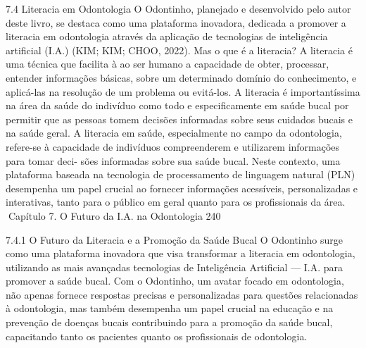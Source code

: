 7.4     Literacia em Odontologia
O Odontinho, planejado e desenvolvido pelo autor deste livro, se destaca como uma
plataforma inovadora, dedicada a promover a literacia em odontologia através da
aplicação de tecnologias de inteligência artificial (I.A.) (KIM; KIM; CHOO, 2022).
          Mas o que é a literacia? A literacia é uma técnica que facilita à ao ser humano a
capacidade de obter, processar, entender informações básicas, sobre um determinado
domínio do conhecimento, e aplicá-las na resolução de um problema ou evitá-los. A
literacia é importantíssima na área da saúde do indivíduo como todo e especificamente
em saúde bucal por permitir que as pessoas tomem decisões informadas sobre seus
cuidados bucais e na saúde geral.
         A literacia em saúde, especialmente no campo da odontologia, refere-se à
capacidade de indivíduos compreenderem e utilizarem informações para tomar deci-
sões informadas sobre sua saúde bucal. Neste contexto, uma plataforma baseada
na tecnologia de processamento de linguagem natural (PLN) desempenha um papel
crucial ao fornecer informações acessíveis, personalizadas e interativas, tanto para o
público em geral quanto para os profissionais da área.
Capítulo 7. O Futuro da I.A. na Odontologia                                        240


7.4.1     O Futuro da Literacia e a Promoção da Saúde Bucal
O Odontinho surge como uma plataforma inovadora que visa transformar a literacia
em odontologia, utilizando as mais avançadas tecnologias de Inteligência Artificial —
I.A. para promover a saúde bucal. Com o Odontinho, um avatar focado em odontologia,
não apenas fornece respostas precisas e personalizadas para questões relacionadas à
odontologia, mas também desempenha um papel crucial na educação e na prevenção
de doenças bucais contribuindo para a promoção da saúde bucal, capacitando tanto os
pacientes quanto os profissionais de odontologia.

